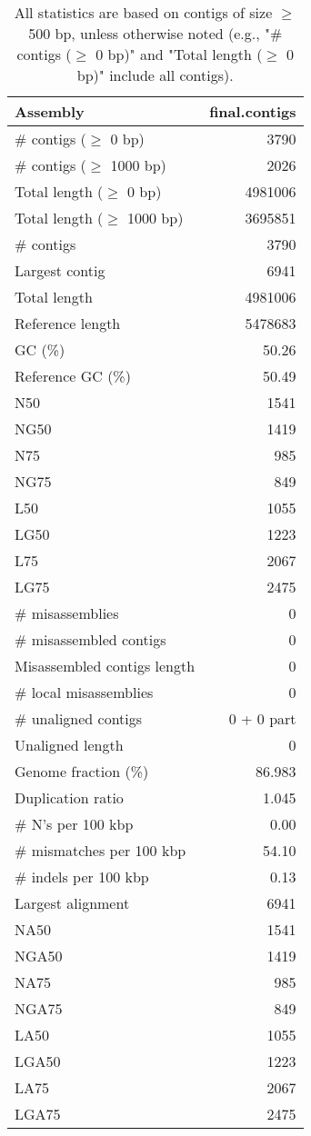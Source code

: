 \documentclass[12pt,a4paper]{article}
\begin{document}
\begin{table}[ht]
\begin{center}
\caption{All statistics are based on contigs of size $\geq$ 500 bp, unless otherwise noted (e.g., "\# contigs ($\geq$ 0 bp)" and "Total length ($\geq$ 0 bp)" include all contigs).}
\begin{tabular}{|l*{1}{|r}|}
\hline
Assembly & final.contigs \\ \hline
\# contigs ($\geq$ 0 bp) & 3790 \\ \hline
\# contigs ($\geq$ 1000 bp) & 2026 \\ \hline
Total length ($\geq$ 0 bp) & 4981006 \\ \hline
Total length ($\geq$ 1000 bp) & 3695851 \\ \hline
\# contigs & 3790 \\ \hline
Largest contig & 6941 \\ \hline
Total length & 4981006 \\ \hline
Reference length & 5478683 \\ \hline
GC (\%) & 50.26 \\ \hline
Reference GC (\%) & 50.49 \\ \hline
N50 & 1541 \\ \hline
NG50 & 1419 \\ \hline
N75 & 985 \\ \hline
NG75 & 849 \\ \hline
L50 & 1055 \\ \hline
LG50 & 1223 \\ \hline
L75 & 2067 \\ \hline
LG75 & 2475 \\ \hline
\# misassemblies & 0 \\ \hline
\# misassembled contigs & 0 \\ \hline
Misassembled contigs length & 0 \\ \hline
\# local misassemblies & 0 \\ \hline
\# unaligned contigs & 0 + 0 part \\ \hline
Unaligned length & 0 \\ \hline
Genome fraction (\%) & 86.983 \\ \hline
Duplication ratio & 1.045 \\ \hline
\# N's per 100 kbp & 0.00 \\ \hline
\# mismatches per 100 kbp & 54.10 \\ \hline
\# indels per 100 kbp & 0.13 \\ \hline
Largest alignment & 6941 \\ \hline
NA50 & 1541 \\ \hline
NGA50 & 1419 \\ \hline
NA75 & 985 \\ \hline
NGA75 & 849 \\ \hline
LA50 & 1055 \\ \hline
LGA50 & 1223 \\ \hline
LA75 & 2067 \\ \hline
LGA75 & 2475 \\ \hline
\end{tabular}
\end{center}
\end{table}
\end{document}
